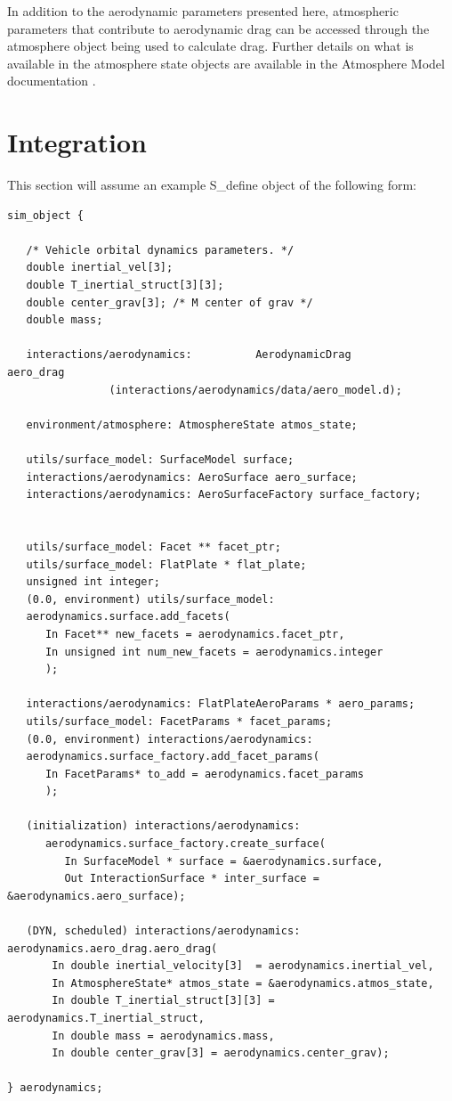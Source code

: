 In addition to the aerodynamic parameters presented here,
atmospheric parameters that contribute to aerodynamic
drag can be accessed through the atmosphere object being used
to calculate drag. Further details on what is available in the
atmosphere state objects are available in the Atmosphere Model
documentation \cite{dynenv:ATMOSPHERE}.

\section{Integration}

This section will assume an example S\_define object of the
following form:

\begin{verbatim}
sim_object {

   /* Vehicle orbital dynamics parameters. */
   double inertial_vel[3];
   double T_inertial_struct[3][3];
   double center_grav[3]; /* M center of grav */
   double mass;

   interactions/aerodynamics:          AerodynamicDrag           aero_drag
                (interactions/aerodynamics/data/aero_model.d);

   environment/atmosphere: AtmosphereState atmos_state;

   utils/surface_model: SurfaceModel surface;
   interactions/aerodynamics: AeroSurface aero_surface;
   interactions/aerodynamics: AeroSurfaceFactory surface_factory;


   utils/surface_model: Facet ** facet_ptr;
   utils/surface_model: FlatPlate * flat_plate;
   unsigned int integer;
   (0.0, environment) utils/surface_model:
   aerodynamics.surface.add_facets(
      In Facet** new_facets = aerodynamics.facet_ptr,
      In unsigned int num_new_facets = aerodynamics.integer
      );

   interactions/aerodynamics: FlatPlateAeroParams * aero_params;
   utils/surface_model: FacetParams * facet_params;
   (0.0, environment) interactions/aerodynamics:
   aerodynamics.surface_factory.add_facet_params(
      In FacetParams* to_add = aerodynamics.facet_params
      );

   (initialization) interactions/aerodynamics:
      aerodynamics.surface_factory.create_surface(
         In SurfaceModel * surface = &aerodynamics.surface,
         Out InteractionSurface * inter_surface = &aerodynamics.aero_surface);

   (DYN, scheduled) interactions/aerodynamics: aerodynamics.aero_drag.aero_drag(
       In double inertial_velocity[3]  = aerodynamics.inertial_vel,
       In AtmosphereState* atmos_state = &aerodynamics.atmos_state,
       In double T_inertial_struct[3][3] = aerodynamics.T_inertial_struct,
       In double mass = aerodynamics.mass,
       In double center_grav[3] = aerodynamics.center_grav);

} aerodynamics;
\end{verbatim}

